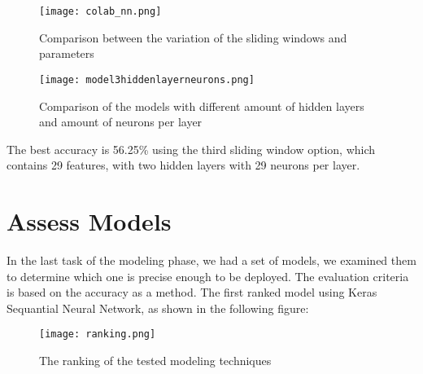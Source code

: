 \begin{figure}[H]
\begin{center}
\texttt{[image: colab\_nn.png]}
\end{center}
\caption{Comparison between the variation of the sliding windows and parameters}
\label{fig:colab_nn}
\end{figure}
\begin{figure}[H]
\begin{center}
\texttt{[image: model3hiddenlayerneurons.png]}
\end{center}
\caption{Comparison of the models with different amount of hidden layers and amount of neurons per layer}
\label{fig:model3hiddenlayerneurons}
\end{figure}
The best accuracy is 56.25\% using the third sliding window option, which contains 29 features, with two hidden layers with 29 neurons per layer.

\section{Assess Models}

In the last task of the modeling phase, we had a set of models, we examined them to determine which one is precise enough to be deployed.\newline \newline
The evaluation criteria is based on the accuracy as a method.\newline \newline
The first ranked model using Keras Sequantial Neural Network, as shown in the following figure:
\begin{figure}[H]
\begin{center}
\texttt{[image: ranking.png]}
\end{center}
\caption{The ranking of the tested modeling techniques}
\label{fig:ranking}
\end{figure}

